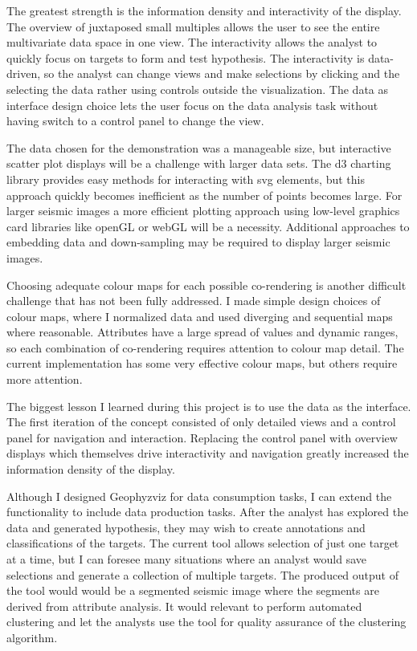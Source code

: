 \documentclass[journal]{vgtc}                %
\begin{document}
The greatest strength is the information density and interactivity of the display. The overview 
of juxtaposed small multiples allows the user to see the entire multivariate data space
in one view. The interactivity allows the analyst to quickly focus on targets to form and
test hypothesis. The interactivity is data-driven, so the analyst can change views and make
selections by clicking and the selecting the data rather using controls outside the visualization. 
The data as interface design choice lets the user focus on the data analysis task without having switch
to a control panel to change the view.

The data chosen for the demonstration was a manageable size, but interactive scatter plot
displays will be a challenge with larger data sets. The d3 charting library provides easy methods for
interacting with svg elements, but this approach quickly becomes inefficient as the number of
points becomes large. For larger seismic images a more efficient plotting approach using low-level
graphics card libraries like openGL or webGL will be a necessity. Additional approaches to embedding
data and down-sampling may be required to display larger seismic images.

Choosing adequate colour maps for each possible co-rendering is another difficult challenge
that has not been fully addressed. I made simple design choices of colour maps, where I normalized
data and used diverging and sequential maps where reasonable. Attributes have a large spread of
values and dynamic ranges, so each combination of co-rendering requires attention to colour map detail.
The current implementation has some very effective colour maps, but others require more attention.

The biggest lesson I learned during this project is to use the data as the interface. The first iteration
of the concept consisted of only detailed views and a control panel for navigation and interaction.
Replacing the control panel with overview displays which themselves drive interactivity and navigation
greatly increased the information density of the display.

Although I designed Geophyzviz for data consumption tasks, I can extend the functionality
to include data production tasks. After the analyst has explored the data and generated hypothesis,
they may wish to create annotations and classifications of the targets. The current tool allows
selection of just one target at a time, but I can foresee many situations where an analyst would
save selections and generate a collection of multiple targets. The produced output of the tool would
would be a segmented seismic image where the segments are derived from attribute analysis. It would
relevant to perform automated clustering and let the analysts use the tool for quality assurance of
the clustering algorithm.
\end{document}
